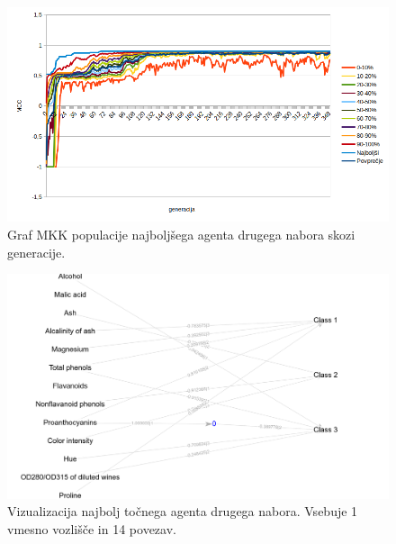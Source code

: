 \begin{figure}[H]
    \begin{center}
        \includegraphics[width=13cm]{wine/2/mcc}
    \end{center}
    \caption{Graf MKK populacije najboljšega agenta drugega nabora skozi generacije.}
    \label{fig:wine_mcc_2}
\end{figure}

\begin{figure}[H]
    \begin{center}
        \includegraphics[width=13cm]{wine/2/acc_g}
    \end{center}
    \caption{Vizualizacija najbolj točnega agenta drugega nabora. Vsebuje 1 vmesno vozlišče in 14 povezav.}
    \label{fig:wine_acc_2_g}
\end{figure}


